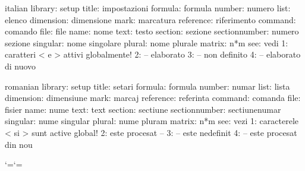 \startmessages  italian library: setup
        title:  impostazioni
      formula:  formula
       number:  numero
         list:  elenco
    dimension:  dimensione
         mark:  marcatura
    reference:  riferimento
      command:  comando
         file:  file
         name:  nome
         text:  testo
      section:  sezione
sectionnumber:  numero sezione
     singular:  nome singolare
       plural:  nome plurale
       matrix:  n*m
          see:  vedi
            1:  caratteri < e > attivi globalmente!
            2:  -- elaborato
            3:  -- non definito
            4:  -- elaborato di nuovo
\stopmessages

\startmessages  romanian library: setup
         title:  setari
       formula:  formula
        number:  numar
          list:  lista
     dimension:  dimensiune
          mark:  marcaj
     reference:  referinta
       command:  comanda
          file:  fisier
          name:  nume
          text:  text
       section:  sectiune
 sectionnumber:  sectiunenumar %
      singular:  nume singular
        plural:  nume pluram
        matrix:  n*m
           see:  vezi
             1:  caracterele < si > sunt active global!
             2:  este procesat --
             3:  -- este nedefinit
             4:  -- este procesat din nou
\stopmessages


\interfacetranslationtrue






\def\setupnumfont  {}
\def\setuptxtfont  {\tttf}
\def\setupvarfont  {\ttsl}
\def\setupoptfont  {\ttsl}
\def\setupalwcolor {}
\def\setupoptcolor {darkgray}




\def\stpt#1{{\tttf#1}}
\def\stpr#1{#1*}
\def\stpv#1{{\setupvarfont#1}}

\bgroup \catcode`\<=\active \catcode`\>=\other

